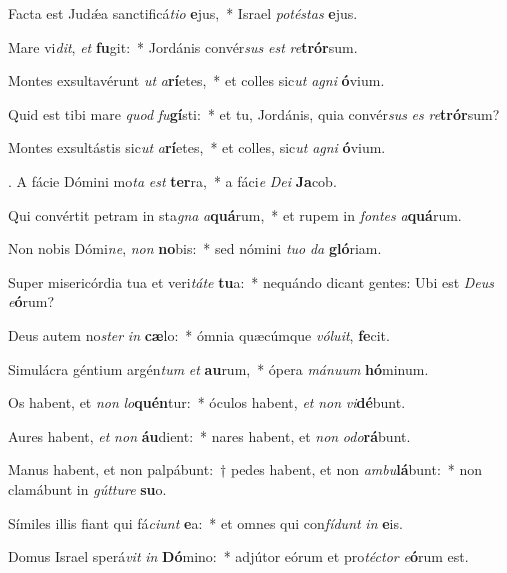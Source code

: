 \item Facta est Judǽa sanctificá\textit{tio} \textbf{e}jus,~* Israel \textit{potéstas} \textbf{e}jus.
\item Mare vi\textit{dit}, \textit{et} \textbf{fu}git:~* Jordánis convér\textit{sus} \textit{est} \textit{re}\textbf{trór}sum.
\item Montes exsultavérunt \textit{ut} \textit{a}\textbf{rí}etes,~* et colles sic\textit{ut} \textit{agni} \textbf{ó}vium.
\item Quid est tibi mare \textit{quod} \textit{fu}\textbf{gí}sti:~* et tu, Jordánis, quia convér\textit{sus} \textit{es} \textit{re}\textbf{trór}sum?
\item Montes exsultástis sic\textit{ut} \textit{a}\textbf{rí}etes,~* et colles, sic\textit{ut} \textit{agni} \textbf{ó}vium.
\item. A fácie Dómini mo\textit{ta} \textit{est} \textbf{ter}ra,~* a fáci\textit{e} \textit{Dei} \textbf{Ja}cob.
\item Qui convértit petram in sta\textit{gna} \textit{a}\textbf{quá}rum,~* et rupem in \textit{fontes} \textit{a}\textbf{quá}rum.
\item Non nobis Dómi\textit{ne}, \textit{non} \textbf{no}bis:~* sed nómini \textit{tuo} \textit{da} \textbf{gló}riam.
\item Super misericórdia tua et veri\textit{táte} \textbf{tu}a:~* nequándo dicant gentes: Ubi est \textit{Deus} \textit{e}\textbf{ó}rum?
\item Deus autem no\textit{ster} \textit{in} \textbf{cæ}lo:~* ómnia quæcúmque \textit{vóluit}, \textbf{fe}cit.
\item Simulácra géntium argén\textit{tum} \textit{et} \textbf{au}rum,~* ópera \textit{mánuum} \textbf{hó}minum.
\item Os habent, et \textit{non} \textit{lo}\textbf{quén}tur:~* óculos habent, \textit{et} \textit{non} \textit{vi}\textbf{dé}bunt.
\item Aures habent, \textit{et} \textit{non} \textbf{áu}dient:~* nares habent, et \textit{non} \textit{odo}\textbf{rá}bunt.
\item Manus habent, et non palpábunt:~† pedes habent, et non \textit{ambu}\textbf{lá}bunt:~* non clamábunt in \textit{gútture} \textbf{su}o.
\item Símiles illis fiant qui fá\textit{ciunt} \textbf{e}a:~* et omnes qui con\textit{fídunt} \textit{in} \textbf{e}is.
\item Domus Israel sperá\textit{vit} \textit{in} \textbf{Dó}mino:~* adjútor eórum et pro\textit{téctor} \textit{e}\textbf{ó}rum est.
